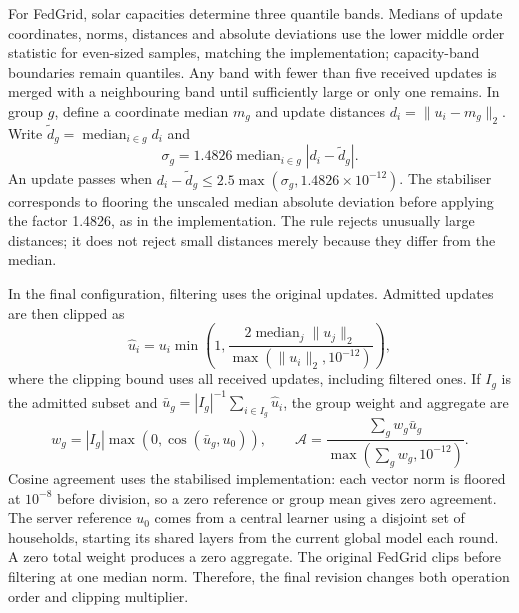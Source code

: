 \documentclass[preprint,12pt,a4paper]{elsarticle}
\begin{document}
For FedGrid, solar capacities determine three quantile bands. Medians of update coordinates, norms, distances and absolute deviations use the lower middle order statistic for even-sized samples, matching the implementation; capacity-band boundaries remain quantiles. Any band with fewer than five received updates is merged with a neighbouring band until sufficiently large or only one remains. In group $g$, define a coordinate median $m_g$ and update distances $d_i=\|u_i-m_g\|_2$. Write $\widetilde d_g=\operatorname{median}_{i\in g}d_i$ and
\begin{equation}
\sigma_g=1.4826\operatorname{median}_{i\in g}|d_i-\widetilde d_g|.
\end{equation}
An update passes when $d_i-\widetilde d_g\leq2.5\max(\sigma_g,1.4826\times10^{-12})$. The stabiliser corresponds to flooring the unscaled median absolute deviation before applying the factor 1.4826, as in the implementation. The rule rejects unusually large distances; it does not reject small distances merely because they differ from the median.

In the final configuration, filtering uses the original updates. Admitted updates are then clipped as
\begin{equation}
\widehat u_i=u_i\min\left(1,\frac{2\operatorname{median}_j\|u_j\|_2}{\max(\|u_i\|_2,10^{-12})}\right),
\end{equation}
where the clipping bound uses all received updates, including filtered ones. If $I_g$ is the admitted subset and $\bar u_g=|I_g|^{-1}\sum_{i\in I_g}\widehat u_i$, the group weight and aggregate are
\begin{equation}
w_g=|I_g|\max(0,\cos(\bar u_g,u_0)),\qquad
\mathcal A=\frac{\sum_gw_g\bar u_g}{\max(\sum_gw_g,10^{-12})}.
\end{equation}
Cosine agreement uses the stabilised implementation: each vector norm is floored at $10^{-8}$ before division, so a zero reference or group mean gives zero agreement. The server reference $u_0$ comes from a central learner using a disjoint set of households, starting its shared layers from the current global model each round. A zero total weight produces a zero aggregate. The original FedGrid clips before filtering at one median norm. Therefore, the final revision changes both operation order and clipping multiplier.
\end{document}
